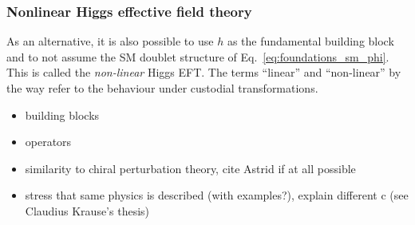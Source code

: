 \subsubsection{Nonlinear Higgs effective field theory}

As an alternative, it is also possible to use $h$ as the fundamental
building block and to not assume the SM doublet structure of
Eq.~\eqref{eq:foundations_sm_phi}. This is called the
\emph{non-linear} Higgs EFT. The terms ``linear'' and ``non-linear''
by the way refer to the behaviour under custodial transformations.

\begin{itemize}
\item building blocks
%
\item operators
%
\item similarity to chiral perturbation theory, cite Astrid if at all possible
%
\item stress that same physics is described (with examples?), explain different c (see Claudius Krause's thesis)
\end{itemize}













